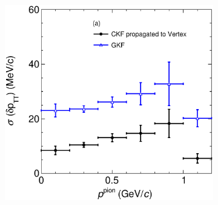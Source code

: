 \begin{figure}[t]
\begin{subfigure}[b]{0.32\textwidth}
         \caption{}
        \label{fig:deltapTTVSlArmMC211.eps}
     \end{subfigure}
     \begin{subfigure}[b]{0.32\textwidth}
         \centering
         \includegraphics[width=\textwidth]{figures/ch6-TKI/2D/deltapTTVSp211.eps}
         \caption{}
         \label{fig:deltapTTVSp211.eps}
     \end{subfigure}


\end{figure}

